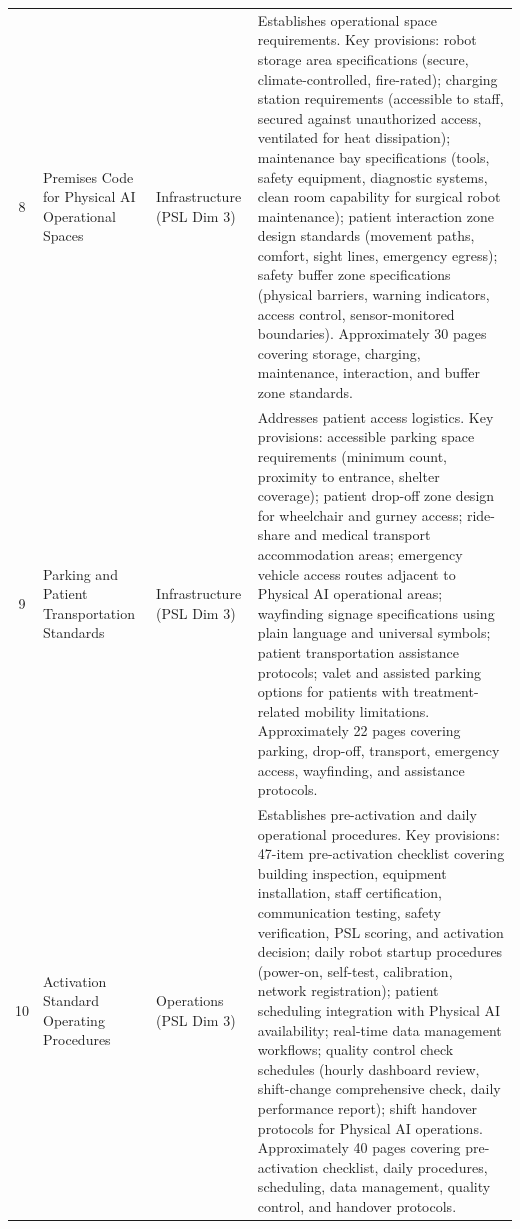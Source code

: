 \begin{longtable}{c >{\raggedright\arraybackslash}p{4.5cm} >{\raggedright\arraybackslash}p{3cm} >{\raggedright\arraybackslash}p{6.5cm}}
8 & Premises Code for Physical AI Operational Spaces & Infrastructure (PSL Dim 3) & Establishes operational space requirements. Key provisions: robot storage area specifications (secure, climate-controlled, fire-rated); charging station requirements (accessible to staff, secured against unauthorized access, ventilated for heat dissipation); maintenance bay specifications (tools, safety equipment, diagnostic systems, clean room capability for surgical robot maintenance); patient interaction zone design standards (movement paths, comfort, sight lines, emergency egress); safety buffer zone specifications (physical barriers, warning indicators, access control, sensor-monitored boundaries). Approximately 30 pages covering storage, charging, maintenance, interaction, and buffer zone standards. \\
9 & Parking and Patient Transportation Standards & Infrastructure (PSL Dim 3) & Addresses patient access logistics. Key provisions: accessible parking space requirements (minimum count, proximity to entrance, shelter coverage); patient drop-off zone design for wheelchair and gurney access; ride-share and medical transport accommodation areas; emergency vehicle access routes adjacent to Physical AI operational areas; wayfinding signage specifications using plain language and universal symbols; patient transportation assistance protocols; valet and assisted parking options for patients with treatment-related mobility limitations. Approximately 22 pages covering parking, drop-off, transport, emergency access, wayfinding, and assistance protocols. \\
10 & Activation Standard Operating Procedures & Operations (PSL Dim 3) & Establishes pre-activation and daily operational procedures. Key provisions: 47-item pre-activation checklist covering building inspection, equipment installation, staff certification, communication testing, safety verification, PSL scoring, and activation decision; daily robot startup procedures (power-on, self-test, calibration, network registration); patient scheduling integration with Physical AI availability; real-time data management workflows; quality control check schedules (hourly dashboard review, shift-change comprehensive check, daily performance report); shift handover protocols for Physical AI operations. Approximately 40 pages covering pre-activation checklist, daily procedures, scheduling, data management, quality control, and handover protocols. \\

\end{longtable}
